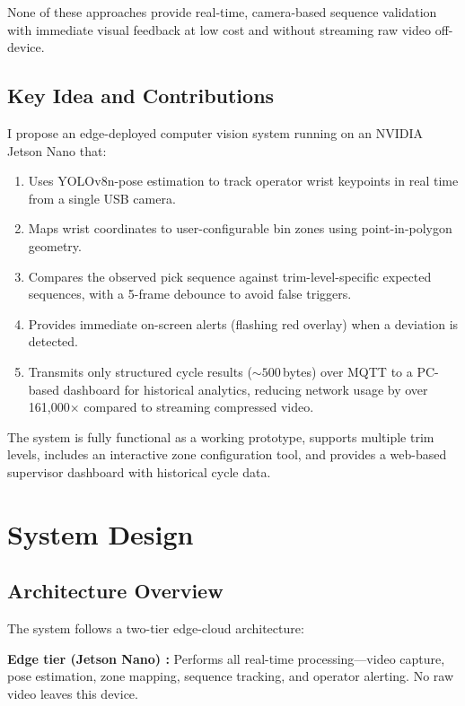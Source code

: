 \documentclass[conference]{IEEEtran}
\begin{document}
None of these approaches provide real-time, camera-based sequence validation with immediate visual feedback at low cost and without streaming raw video off-device.

\subsection{Key Idea and Contributions}
I propose an edge-deployed computer vision system running on an NVIDIA Jetson Nano that:

\begin{enumerate}
    \item Uses YOLOv8n-pose estimation \cite{b1} to track operator wrist keypoints in real time from a single USB camera.
    \item Maps wrist coordinates to user-configurable bin zones using point-in-polygon geometry.
    \item Compares the observed pick sequence against trim-level-specific expected sequences, with a 5-frame debounce to avoid false triggers.
    \item Provides immediate on-screen alerts (flashing red overlay) when a deviation is detected.
    \item Transmits only structured cycle results (${\sim}500$\,bytes) over MQTT \cite{b7} to a PC-based dashboard for historical analytics, reducing network usage by over 161{,}000$\times$ compared to streaming compressed video.
\end{enumerate}

The system is fully functional as a working prototype, supports multiple trim levels, includes an interactive zone configuration tool, and provides a web-based supervisor dashboard with historical cycle data.

\section{System Design}

\subsection{Architecture Overview}
The system follows a two-tier edge-cloud architecture:

\textbf{Edge tier (Jetson Nano) \cite{b3}:} Performs all real-time processing---video capture, pose estimation, zone mapping, sequence tracking, and operator alerting. No raw video leaves this device.
\end{document}
